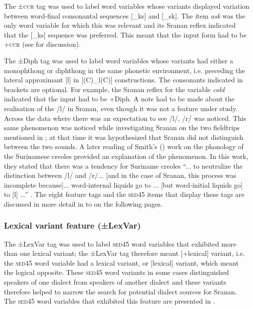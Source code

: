 {The {±\textsc{ccr} } tag was used to label word variables whose variants displayed variation between word-final consonantal sequences [{\_}ks] and [{\_}sk]. The item \emph{ask} was the only word variable for which this was relevant and its Sranan reflex \textipa{[hakisi]}  indicated that the [{\_}ks] sequence was preferred. This meant that the input form had to be +\textsc{ccr} (see  for discussion).

The {±Diph } tag was used to label word variables whose variants had either a monophthong or diphthong in the same phonetic environment, i.e. preceding the lateral approximant [l] in [(C){\_}l(C)] constructions. The consonants indicated in brackets are optional. For example, the Sranan reflex for the variable  \emph{cold} \textipa{[kowru]} indicated that the input had to be +Diph. A note had to be made about the realisation of the /l/ in Sranan, even though it was not a feature under study. Across the data where there was an expectation to see /l/, /r/ was noticed. This same phenomenon was noticed while investigating Sranan on the two fieldtrips mentioned in ; at that time it was hypothesized that Sranan did not distinguish between the two sounds. A later reading of Smith's (\citeyear{Smith04}) work on the phonology of the Surinamese creoles provided an explanation of the phenomenon. In this work, they stated that there was a tendency for Suriname creoles ``... to neutralize the distinction between /l/ and /r/... [and in the case of Sranan, this process was incomplete because]... word-internal liquids go to \textipa{[r]} ... [but word-initial liquids go] to [l] ...'' \citep[562]{Smith04}. The eight feature tags and the \textsc{sed45} items that display these tags are discussed in more detail in  to  on the following pages.

\subsubsection {Lexical variant feature (±LexVar)} \label{3.3.2.1}
The {±LexVar} tag was used to label \textsc{sed45} word variables that
exhibited more than one lexical variant; the ±LexVar tag therefore meant [+lexical] variant, i.e. the \textsc{sed45} word variable had a lexical variant, or [\textminus{}lexical] variant, which meant the logical opposite. These \textsc{sed45} word variants in some cases distinguished speakers of one dialect from speakers of another dialect and these variants therefore helped to narrow the search for potential dialect sources for Sranan. The \textsc{sed45} word variables that exhibited this feature are presented in .
\clearpage

}
